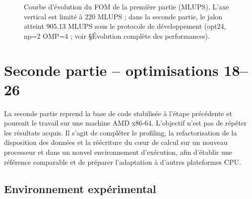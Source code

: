 \documentclass[a4paper,11pt,oneside]{report}
\begin{document}
\begin{figure}[H]
\centering
{}
\caption{Courbe d'évolution du FOM de la première partie (MLUPS). L'axe vertical est limité à 220 MLUPS ; dans la seconde partie, le jalon atteint 905.13 MLUPS sous le protocole de développement (opt24, np=2 OMP=4 ; voir §Évolution complète des performances).}
\end{figure}

\chapter*{Seconde partie -- optimisations 18--26}

La seconde partie reprend la base de code stabilisée à l'étape précédente et poursuit le travail sur une machine AMD x86-64. L'objectif n'est pas de répéter les résultats acquis. Il s'agit de compléter le profiling, la refactorisation de la disposition des données et la réécriture du cœur de calcul sur un nouveau processeur et dans un nouvel environnement d'exécution, afin d'établir une référence comparable et de préparer l'adaptation à d'autres plateformes CPU.

\section{Environnement expérimental}
\end{document}
